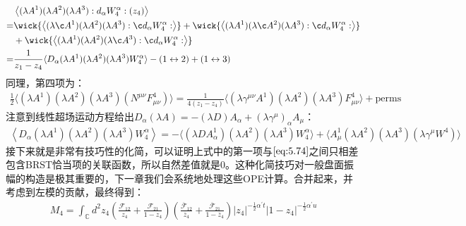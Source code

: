 \begin{equation}
	\begin{aligned}
		&\left\langle(\lambda A^1)(\lambda A^2)(\lambda A^3):d_\alpha W_4^\alpha:(z_4)\right\rangle\\
		=&\wick{\left\langle(\lambda \c A^1)(\lambda A^2)(\lambda A^3): \c d_\alpha W_4^\alpha:\right\rangle}+\wick{\left\langle(\lambda  A^1)(\lambda\c A^2)(\lambda A^3): \c d_\alpha W_4^\alpha:\right\rangle}\\
		&+\wick{\left\langle(\lambda  A^1)(\lambda A^2)(\lambda\c A^3):\c d_\alpha  W_4^\alpha:\right\rangle}\\
		=&\frac{1}{z_1-z_4}\langle D_\alpha(\lambda A^1)(\lambda A^2)(\lambda A^3)W_4^\alpha\rangle-(1\leftrightarrow2)+(1\leftrightarrow3)
	\end{aligned}
\end{equation}
同理，第四项为：
\begin{equation}
	\label{eq:5.74}
	\begin{aligned}
		\frac{1}{2}\big\langle(\lambda A^1)(\lambda A^2)(\lambda A^3)(N^{\mu\nu}F_{\mu\nu}^4)\big\rangle
		= \frac{1}{4(z_1-z_4)}\big\langle(\lambda\gamma^{\mu\nu}A^1)(\lambda A^2)(\lambda A^3)F_{\mu\nu}^4\big\rangle + \text{perms}
	\end{aligned}
\end{equation}
注意到线性超场运动方程给出$D_\alpha(\lambda A)=-(\lambda D)A_\alpha+(\lambda\gamma^\mu)_\alpha A_\mu$：
\begin{equation}
	\begin{aligned}
		\left\langle D_\alpha(\lambda A^1)(\lambda A^2)(\lambda A^3)W_4^\alpha\right\rangle=-\langle(\lambda DA_\alpha^1)(\lambda A^2)(\lambda A^3)W_4^\alpha\rangle+\langle A_\mu^1(\lambda A^2)(\lambda A^3)(\lambda\gamma^\mu W^4)\rangle
	\end{aligned}
\end{equation}
接下来就是非常有技巧性的化简，可以证明上式中的第一项与$\ref{eq:5.74}$之间只相差包含BRST恰当项的关联函数，所以自然差值就是$0$。这种化简技巧对一般盘面振幅的构造是极其重要的，下一章我们会系统地处理这些OPE计算。合并起来，并考虑到左模的贡献，最终得到：
\begin{equation}
	\begin{aligned}
		M_4=\int_\mathbb{C} d^2z_4\left(\frac{\mathcal{F}_{12}}{z_4}+\frac{\mathcal{F}_{21}}{1-z_4}\right)\left(\frac{\overline{\mathcal{F}}_{12}}{\overline{z}_4}+\frac{\overline{\mathcal{F}}_{21}}{1-\overline{z}_4}\right)|z_4|^{-\frac{1}{2}\alpha^{\prime}t}|1-z_4|^{-\frac{1}{2}\alpha^{\prime}u}
	\end{aligned}
\end{equation}
